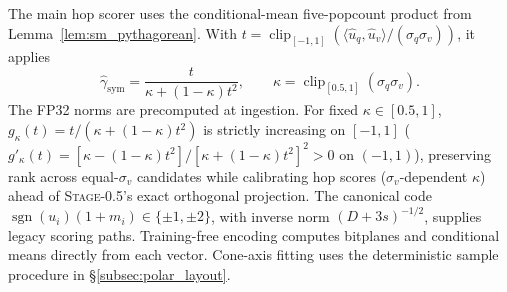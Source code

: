 The main hop scorer uses the conditional-mean five-popcount product from Lemma~\ref{lem:sm_pythagorean}. With $t=\operatorname{clip}_{[-1,1]}(\langle\hat u_q,\hat u_v\rangle/(\sigma_q\sigma_v))$, it applies
\begin{equation}
  \hat\gamma_{\mathrm{sym}}=\frac{t}{\kappa+(1-\kappa)t^2},\qquad
  \kappa=\operatorname{clip}_{[0.5,1]}(\sigma_q\sigma_v).
  \label{eq:sm_calibration}
\end{equation}
The FP32 norms are precomputed at ingestion. For fixed $\kappa \in [0.5, 1]$, $g_\kappa(t) = t / (\kappa + (1 - \kappa)t^2)$ is strictly increasing on $[-1, 1]$ ($g'_\kappa(t) = [\kappa - (1 - \kappa)t^2] / [\kappa + (1 - \kappa)t^2]^2 > 0$ on $(-1, 1)$), preserving rank across equal-$\sigma_v$ candidates while calibrating hop scores ($\sigma_v$-dependent $\kappa$) ahead of \textsc{Stage-0.5}'s exact orthogonal projection. The canonical code $\operatorname{sgn}(u_i)(1+m_i)\in\{\pm1,\pm2\}$, with inverse norm $(D+3s)^{-1/2}$, supplies legacy scoring paths. Training-free encoding computes bitplanes and conditional means directly from each vector. Cone-axis fitting uses the deterministic sample procedure in \S\ref{subsec:polar_layout}.

